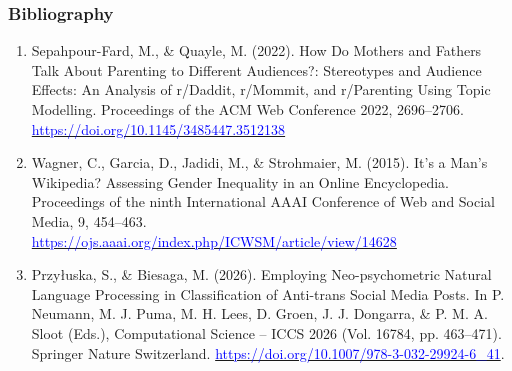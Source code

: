 \documentclass[aspectratio=169]{beamer}
\begin{document}
\begin{frame}
    \frametitle{Bibliography}
    \tiny
    \begin{enumerate}
        \item Sepahpour-Fard, M., \& Quayle, M. (2022). How Do Mothers and Fathers Talk About Parenting to Different Audiences?: Stereotypes and Audience Effects: An Analysis of r/Daddit, r/Mommit, and r/Parenting Using Topic Modelling. Proceedings of the ACM Web Conference 2022, 2696–2706. \href{https://doi.org/10.1145/3485447.3512138}{\textcolor{blue}{https://doi.org/10.1145/3485447.3512138}}
        \item Wagner, C., Garcia, D., Jadidi, M., \& Strohmaier, M. (2015). It’s a Man’s Wikipedia? Assessing Gender Inequality in an Online Encyclopedia. Proceedings of the ninth International AAAI Conference of Web and Social Media, 9, 454–463. \href{https://ojs.aaai.org/index.php/ICWSM/article/view/14628}{\textcolor{blue}{https://ojs.aaai.org/index.php/ICWSM/article/view/14628}}
        \item Przyłuska, S., \& Biesaga, M. (2026). Employing Neo-psychometric Natural Language Processing in Classification of Anti-trans Social Media Posts. In P. Neumann, M. J. Puma, M. H. Lees, D. Groen, J. J. Dongarra, \& P. M. A. Sloot (Eds.), Computational Science – ICCS 2026 (Vol. 16784, pp. 463–471). Springer Nature Switzerland. \href{https://doi.org/10.1007/978-3-032-29924-6\_41}{\textcolor{blue}{https://doi.org/10.1007/978-3-032-29924-6\_41}}.

\end{enumerate}
\end{frame}
\end{document}
